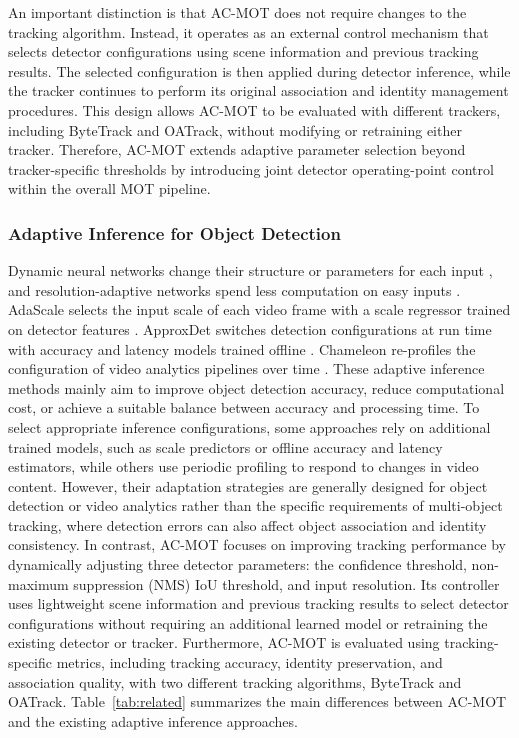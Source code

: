 \documentclass[pdflatex,sn-mathphys-num,iicol]{sn-jnl}
\begin{document}
An important distinction is that AC-MOT does not require changes to the tracking algorithm. Instead, it operates as an external control mechanism that selects detector configurations using scene information and previous tracking results. The selected configuration is then applied during detector inference, while the tracker continues to perform its original association and identity management procedures. This design allows AC-MOT to be evaluated with different trackers, including ByteTrack and OATrack, without modifying or retraining either tracker. Therefore, AC-MOT extends adaptive parameter selection beyond tracker-specific thresholds by introducing joint detector operating-point control within the overall MOT pipeline.

\subsubsection{Adaptive Inference for Object Detection}
Dynamic neural networks change their structure or parameters for each input
\cite{han2022dynamic}, and resolution-adaptive networks spend less computation
on easy inputs \cite{yang2020ranet}. AdaScale selects the input scale of each
video frame with a scale regressor trained on detector features
\cite{chin2019adascale}. ApproxDet switches detection configurations at run
time with accuracy and latency models trained offline \cite{xu2020approxdet}.
Chameleon re-profiles the configuration of video analytics pipelines over time
\cite{jiang2018chameleon}. These adaptive inference methods mainly aim to improve object detection accuracy, reduce computational cost, or achieve a suitable balance between accuracy and processing time. To select appropriate inference configurations, some approaches rely on additional trained models, such as scale predictors or offline accuracy and latency estimators, while others use periodic profiling to respond to changes in video content. However, their adaptation strategies are generally designed for object detection or video analytics rather than the specific requirements of multi-object tracking, where detection errors can also affect object association and identity consistency. In contrast, AC-MOT focuses on improving tracking performance by dynamically adjusting three detector parameters: the confidence threshold, non-maximum suppression (NMS) IoU threshold, and input resolution. Its controller uses lightweight scene information and previous tracking results to select detector configurations without requiring an additional learned model or retraining the existing detector or tracker. Furthermore, AC-MOT is evaluated using tracking-specific metrics, including tracking accuracy, identity preservation, and association quality, with two different tracking algorithms, ByteTrack and OATrack. Table~\ref{tab:related} summarizes the main differences between AC-MOT and the existing adaptive inference approaches.
\end{document}
